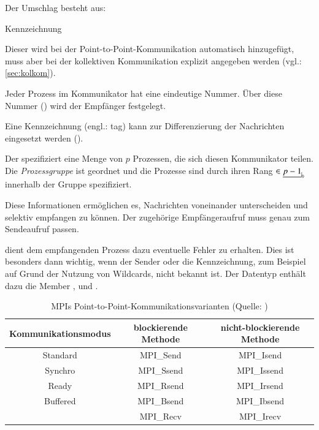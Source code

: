     Der Umschlag besteht aus:
    \begin{labeling}{Kennzeichnung}
     \item[Sender] Dieser wird bei der Point-to-Point-Kommunikation automatisch hinzugefügt, muss aber bei der kollektiven Kommunikation explizit angegeben werden (vgl.: \autoref{sec:kolkom}).
     \item[Empfänger] Jeder Prozess im Kommunikator hat eine eindeutige Nummer. Über diese Nummer () wird der Empfänger festgelegt.
     \item[Kennzeichnung] Eine Kennzeichnung (engl.: tag) kann zur Differenzierung der Nachrichten eingesetzt werden ().
     \item[Kommunikator] Der  spezifiziert eine Menge von $p$ Prozessen, die sich diesen Kommunikator teilen. Die \textit{Prozessgruppe} ist geordnet und
			 die Prozesse sind durch ihren Rang  $\in \nullhaken{p-1}$ innerhalb der Gruppe spezifiziert.
    \end{labeling}
    Diese Informationen ermöglichen es, Nachrichten voneinander unterscheiden und selektiv empfangen zu können. Der zugehörige Empfängeraufruf muss genau zum Sendeaufruf
    passen. \citep{mpiv31}
    
     dient dem empfangenden Prozess dazu eventuelle Fehler zu erhalten. Dies ist besonders dann wichtig, wenn der Sender oder die Kennzeichnung,
    zum Beispiel auf Grund der Nutzung von Wildcards, nicht bekannt ist. Der Datentyp  enthält dazu die Member ,  und .
    \citep{mpiv31}
    
    \begin{table}
      \begin{tabular}{|c|c|c|}
	\hline
	\textbf{Kommunikationsmodus}&\textbf{blockierende Methode}&\textbf{nicht-blockierende Methode}\\
	\hline
	Standard		    &MPI\_Send			  &MPI\_Isend			      \\
	\hline
	Synchro                     &MPI\_Ssend                   &MPI\_Issend                        \\
	\hline
	Ready                       &MPI\_Rsend                   &MPI\_Irsend                        \\
	\hline
	Buffered                    &MPI\_Bsend                   &MPI\_Ibsend                        \\
	\hline
	                            &MPI\_Recv                    &MPI\_Irecv                         \\
	\hline
      \end{tabular}
    \caption{MPIs Point-to-Point-Kommunikationsvarianten (Quelle: \citet{mpi_p2p})}
    \label{tab:p2p_comm}
    \end{table}
    
